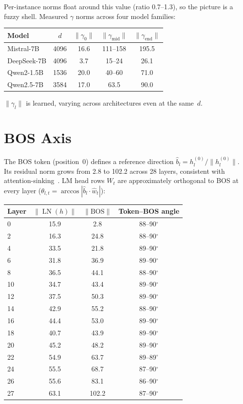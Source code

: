 \documentclass{article}
\begin{document}
Per-instance norms float around this value (ratio 0.7--1.3), so the picture is a
fuzzy shell. Measured $\gamma$ norms across four model families:

\begin{center}
\begin{tabular}{lcccc}
\toprule
Model & $d$ & $\|\gamma_0\|$ & $\|\gamma_{\mathrm{mid}}\|$ & $\|\gamma_{\mathrm{end}}\|$ \\
\midrule
Mistral-7B & 4096 & 16.6 & 111--158 & 195.5 \\
DeepSeek-7B & 4096 & 3.7 & 15--24 & 26.1 \\
Qwen2-1.5B & 1536 & 20.0 & 40--60 & 71.0 \\
Qwen2.5-7B & 3584 & 17.0 & 63.5 & 90.0 \\
\bottomrule
\end{tabular}
\end{center}

$\|\gamma_l\|$ is learned, varying across architectures even at the same~$d$.

\section{BOS Axis}

The BOS token (position~0) defines a reference direction $\hat{b}_l =
h_l^{(0)}/\|h_l^{(0)}\|$. Its residual norm grows from 2.8 to 102.2 across
28 layers, consistent with attention-sinking~\cite{xiao2023efficient}. LM head
rows $W_t$ are approximately orthogonal to BOS at every layer ($\theta_{l,t} =
\arccos|\hat{b}_l \cdot \hat{w}_t|$):

\small
\begin{center}
\begin{tabular}{lccc}
\toprule
Layer & $\|\operatorname{LN}(h)\|$ & $\|\mathrm{BOS}\|$ & Token--BOS angle \\
\midrule
0  & 15.9 & 2.8  & 88--90$^\circ$ \\
2  & 16.3 & 24.8 & 88--90$^\circ$ \\
4  & 33.5 & 21.8 & 89--90$^\circ$ \\
6  & 31.8 & 36.9 & 89--90$^\circ$ \\
8  & 36.5 & 44.1 & 88--90$^\circ$ \\
10 & 34.7 & 43.4 & 89--90$^\circ$ \\
12 & 37.5 & 50.3 & 89--90$^\circ$ \\
14 & 42.9 & 55.2 & 88--90$^\circ$ \\
16 & 44.4 & 53.0 & 89--90$^\circ$ \\
18 & 40.7 & 43.9 & 89--90$^\circ$ \\
20 & 45.2 & 48.2 & 89--90$^\circ$ \\
22 & 54.9 & 63.7 & 89--89$^\circ$ \\
24 & 55.5 & 68.7 & 87--90$^\circ$ \\
26 & 55.6 & 83.1 & 86--90$^\circ$ \\
27 & 63.1 & 102.2 & 87--90$^\circ$ \\
\bottomrule
\end{tabular}
\end{center}
\normalsize
\end{document}
